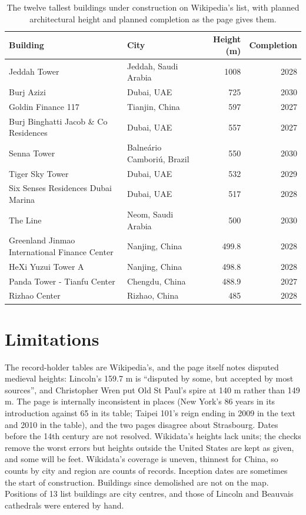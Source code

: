 \documentclass[11pt,a4paper]{article}
\begin{document}
\begin{table}[tbp]\centering\small\caption{The twelve tallest buildings under construction on Wikipedia's list, with planned architectural height and planned completion as the page gives them.}\label{tab:uc}\begin{tabular}{>{\raggedright\arraybackslash}p{5.2cm}>{\raggedright\arraybackslash}p{4.6cm}rr}\toprule Building & City & Height (m) & Completion\\\midrule
Jeddah Tower & Jeddah, Saudi Arabia & 1008 & 2028\\
Burj Azizi & Dubai, UAE & 725 & 2030\\
Goldin Finance 117 & Tianjin, China & 597 & 2027\\
Burj Binghatti Jacob \& Co Residences & Dubai, UAE & 557 & 2027\\
Senna Tower & Balneário Camboriú, Brazil & 550 & 2030\\
Tiger Sky Tower & Dubai, UAE & 532 & 2029\\
Six Senses Residences Dubai Marina & Dubai, UAE & 517 & 2028\\
The Line & Neom, Saudi Arabia & 500 & 2030\\
Greenland Jinmao International Finance Center & Nanjing, China & 499.8 & 2028\\
HeXi Yuzui Tower A & Nanjing, China & 498.8 & 2028\\
Panda Tower - Tianfu Center & Chengdu, China & 488.9 & 2027\\
Rizhao Center & Rizhao, China & 485 & 2028\\
\bottomrule\end{tabular}\end{table}

\section{Limitations}
The record-holder tables are Wikipedia's, and the page itself notes disputed medieval heights: Lincoln's 159.7 m is ``disputed by some, but accepted by most sources'', and Christopher Wren put Old St Paul's spire at 140 m rather than 149 m. The page is internally inconsistent in places (New York's 86 years in its introduction against 65 in its table; Taipei 101's reign ending in 2009 in the text and 2010 in the table), and the two pages disagree about Strasbourg. Dates before the 14th century are not resolved. Wikidata's heights lack units; the checks remove the worst errors but heights outside the United States are kept as given, and some will be feet. Wikidata's coverage is uneven, thinnest for China, so counts by city and region are counts of records. Inception dates are sometimes the start of construction. Buildings since demolished are not on the map. Positions of 13 list buildings are city centres, and those of Lincoln and Beauvais cathedrals were entered by hand.
\end{document}

